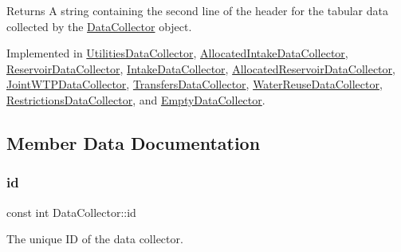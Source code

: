 \begin{DoxyReturn}{Returns}
A string containing the second line of the header for the tabular data collected by the \mbox{\hyperlink{classDataCollector}{Data\+Collector}} object. 
\end{DoxyReturn}


Implemented in \mbox{\hyperlink{classUtilitiesDataCollector_ae502a096e8f4fdfdfd481ab2093f9771}{Utilities\+Data\+Collector}}, \mbox{\hyperlink{classAllocatedIntakeDataCollector_aeee44be0f105fb0d5feac72f4c80f7ff}{Allocated\+Intake\+Data\+Collector}}, \mbox{\hyperlink{classReservoirDataCollector_ae2f8e808c5960608e510a64c7f00ad1b}{Reservoir\+Data\+Collector}}, \mbox{\hyperlink{classIntakeDataCollector_a2855eb8eed71649309bd4d9336f258c0}{Intake\+Data\+Collector}}, \mbox{\hyperlink{classAllocatedReservoirDataCollector_a30d8c59205862822f6548472ba62e537}{Allocated\+Reservoir\+Data\+Collector}}, \mbox{\hyperlink{classJointWTPDataCollector_ab5828bc2dec423f812b5591ea42e9972}{Joint\+W\+T\+P\+Data\+Collector}}, \mbox{\hyperlink{classTransfersDataCollector_ade6b896383f079d8973076e6b9a8053a}{Transfers\+Data\+Collector}}, \mbox{\hyperlink{classWaterReuseDataCollector_a8cead3771efabeb62dcf069008810f43}{Water\+Reuse\+Data\+Collector}}, \mbox{\hyperlink{classRestrictionsDataCollector_afb3c49c2c9b152bb2372e2fcc198e1b8}{Restrictions\+Data\+Collector}}, and \mbox{\hyperlink{classEmptyDataCollector_aa71282121251d344d674223409445be9}{Empty\+Data\+Collector}}.



\subsection{Member Data Documentation}
\mbox{\label{classDataCollector_a5cb840b6fbcf6afe364eef9114984383}} 
\subsubsection{\texorpdfstring{id}{id}}
{\footnotesize\ttfamily const int Data\+Collector\+::id}



The unique ID of the data collector. 

\mbox{\label{classDataCollector_a3a9a5033592f72ada429aa20056162b9}} 
